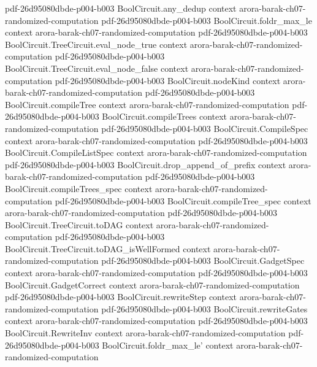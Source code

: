 \begin{theorem}
  {pdf-26d95080dbde-p004-b003}
\proofstep
  {BoolCircuit.any_dedup}
  {context}
  {arora-barak-ch07-randomized-computation}
  {pdf-26d95080dbde-p004-b003}
\proofstep
  {BoolCircuit.foldr_max_le}
  {context}
  {arora-barak-ch07-randomized-computation}
  {pdf-26d95080dbde-p004-b003}
\proofstep
  {BoolCircuit.TreeCircuit.eval_node_true}
  {context}
  {arora-barak-ch07-randomized-computation}
  {pdf-26d95080dbde-p004-b003}
\proofstep
  {BoolCircuit.TreeCircuit.eval_node_false}
  {context}
  {arora-barak-ch07-randomized-computation}
  {pdf-26d95080dbde-p004-b003}
\proofstep
  {BoolCircuit.nodeKind}
  {context}
  {arora-barak-ch07-randomized-computation}
  {pdf-26d95080dbde-p004-b003}
\proofstep
  {BoolCircuit.compileTree}
  {context}
  {arora-barak-ch07-randomized-computation}
  {pdf-26d95080dbde-p004-b003}
\proofstep
  {BoolCircuit.compileTrees}
  {context}
  {arora-barak-ch07-randomized-computation}
  {pdf-26d95080dbde-p004-b003}
\proofstep
  {BoolCircuit.CompileSpec}
  {context}
  {arora-barak-ch07-randomized-computation}
  {pdf-26d95080dbde-p004-b003}
\proofstep
  {BoolCircuit.CompileListSpec}
  {context}
  {arora-barak-ch07-randomized-computation}
  {pdf-26d95080dbde-p004-b003}
\proofstep
  {BoolCircuit.drop_append_of_prefix}
  {context}
  {arora-barak-ch07-randomized-computation}
  {pdf-26d95080dbde-p004-b003}
\proofstep
  {BoolCircuit.compileTrees_spec}
  {context}
  {arora-barak-ch07-randomized-computation}
  {pdf-26d95080dbde-p004-b003}
\proofstep
  {BoolCircuit.compileTree_spec}
  {context}
  {arora-barak-ch07-randomized-computation}
  {pdf-26d95080dbde-p004-b003}
\proofstep
  {BoolCircuit.TreeCircuit.toDAG}
  {context}
  {arora-barak-ch07-randomized-computation}
  {pdf-26d95080dbde-p004-b003}
\proofstep
  {BoolCircuit.TreeCircuit.toDAG_isWellFormed}
  {context}
  {arora-barak-ch07-randomized-computation}
  {pdf-26d95080dbde-p004-b003}
\proofstep
  {BoolCircuit.GadgetSpec}
  {context}
  {arora-barak-ch07-randomized-computation}
  {pdf-26d95080dbde-p004-b003}
\proofstep
  {BoolCircuit.GadgetCorrect}
  {context}
  {arora-barak-ch07-randomized-computation}
  {pdf-26d95080dbde-p004-b003}
\proofstep
  {BoolCircuit.rewriteStep}
  {context}
  {arora-barak-ch07-randomized-computation}
  {pdf-26d95080dbde-p004-b003}
\proofstep
  {BoolCircuit.rewriteGates}
  {context}
  {arora-barak-ch07-randomized-computation}
  {pdf-26d95080dbde-p004-b003}
\proofstep
  {BoolCircuit.RewriteInv}
  {context}
  {arora-barak-ch07-randomized-computation}
  {pdf-26d95080dbde-p004-b003}
\proofstep
  {BoolCircuit.foldr_max_le'}
  {context}
  {arora-barak-ch07-randomized-computation}

\end{theorem}
